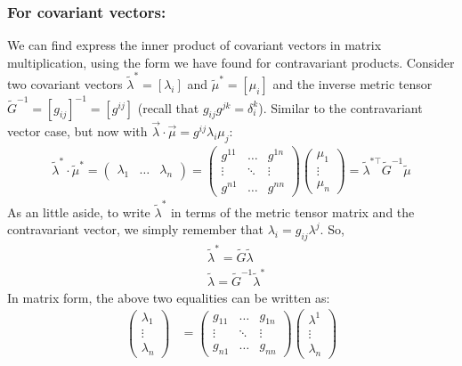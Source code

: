 \documentclass{book}
\theoremstyle{definition}
\begin{document}
\subsubsection{For covariant vectors:}
We can find express the inner product of covariant vectors in matrix multiplication, using the form we have found for contravariant products. Consider two covariant vectors $\tilde{\lambda}^* = [\lambda_i]$ and $\tilde{\mu}^* = [\mu_i]$ and the inverse metric tensor $\tilde{G}^{-1} = [g_{ij}]^{-1} = [g^{ij}]$ (recall that $g_{ij}g^{jk} = \delta^k_i$). Similar to the contravariant vector case, but now with $\vec{\lambda}\cdot\vec{\mu} = g^{ij}\lambda_i\mu_j$:
\begin{align*}
\boxed{
\tilde{\lambda}^*\cdot\tilde{\mu}^* = 
\begin{pmatrix}
\lambda_1 & \dots & \lambda_n
\end{pmatrix}
=
\begin{pmatrix}
g^{11} & \dots & g^{1n}\\
\vdots & \ddots & \vdots \\
g^{n1} & \dots & g^{nn}
\end{pmatrix}
\begin{pmatrix}
\mu_1 \\
\vdots\\
\mu_n
\end{pmatrix}
=
\tilde{\lambda}^{*\top}\tilde{G}^{-1}\tilde{\mu}
}
\end{align*}
As an little aside, to write $\tilde{\lambda}^*$ in terms of the metric tensor matrix and the contravariant vector, we simply remember that $\lambda_i = g_{ij}\lambda^j$. So,
\begin{align*}
&\tilde{\lambda}^* = \tilde{G}\tilde{\lambda}\\
&\tilde{\lambda} = \tilde{G}^{-1}\tilde{\lambda}^*
\end{align*}
In matrix form, the above two equalities can be written as:
\begin{align*}
\begin{pmatrix}
\lambda_1 \\
\vdots\\
\lambda_n
\end{pmatrix}
&=
\begin{pmatrix}
g_{11} & \dots & g_{1n}\\
\vdots & \ddots & \vdots\\
g_{n1} & \dots & g_{nn}
\end{pmatrix}
\begin{pmatrix}
\lambda^1\\
\vdots\\
\lambda_n
\end{pmatrix}
\end{align*}
\end{document}
